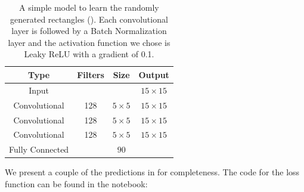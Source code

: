 \begin{table}[htbp]
    \centering
    \begin{tabular}{c|c|c|c}
        Type            & Filters  & Size         & Output            \\
        \hline
        Input           &          &              & $15 \times 15$    \\
        Convolutional   & 128      & $5 \times 5$ & $15 \times 15$    \\
        Convolutional   & 128      & $5 \times 5$ & $15 \times 15$    \\
        Convolutional   & 128      & $5 \times 5$ & $15 \times 15$    \\
        Fully Connected &          & $90$         &                   \\
    \end{tabular}
    \caption{
        A simple model to learn the randomly generated rectangles ().
        Each convolutional layer is followed by a Batch Normalization layer and the activation function we chose is Leaky ReLU with a gradient of 0.1.
    }
    \label{Table:Face-Detection:rectangles-model}
\end{table}

We present a couple of the predictions in  for completeness.
The code for the loss function can be found in the notebook: \href{https://github.com/nicholaspun/IZ-Net/blob/master/notebooks/ObjectDetectionTest.ipynb}{}

